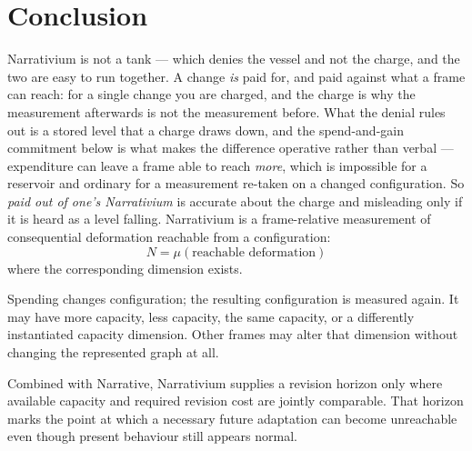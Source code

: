 \documentclass[11pt,a4paper]{article}
\theoremstyle{remark}
\begin{document}
\section{Conclusion}\label{sec:conclusion}

Narrativium is not a tank --- which denies the vessel and not the charge, and the two are easy to run
together. A change \emph{is} paid for, and paid against what a frame can reach: for a single change you
are charged, and the charge is why the measurement afterwards is not the measurement before. What the
denial rules out is a stored level that a charge draws down, and the spend-and-gain commitment below is
what makes the difference operative rather than verbal --- expenditure can leave a frame able to reach
\emph{more}, which is impossible for a reservoir and ordinary for a measurement re-taken on a changed
configuration. So \emph{paid out of one's Narrativium} is accurate about the charge and misleading only
if it is heard as a level falling. Narrativium is a frame-relative measurement of consequential
deformation reachable from a configuration:
\[
\boxed{
N
=
\mu(\text{reachable deformation})
}
\]
where the corresponding dimension exists.

Spending changes configuration; the resulting configuration is measured again. It may have more capacity, less capacity, the same capacity, or a differently instantiated capacity dimension. Other frames may alter that dimension without changing the represented graph at all.

Combined with Narrative, Narrativium supplies a revision horizon only where available capacity and required revision cost are jointly comparable. That horizon marks the point at which a necessary future adaptation can become unreachable even though present behaviour still appears normal.
\end{document}
